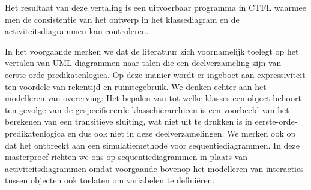 Het resultaat van deze vertaling is een uitvoerbaar programma in CTFL waarmee men de consistentie van het ontwerp in het klassediagram en de activiteitsdiagrammen kan controleren.

\parbreak

In het voorgaande merken we dat de literatuur zich voornamelijk toelegt op het vertalen van UML-diagrammen naar talen die een deelverzameling zijn van eerste-orde-predikatenlogica. Op deze manier wordt er ingeboet aan expressiviteit ten voordele van rekentijd en ruimtegebruik. We denken echter aan het modelleren van overerving: Het bepalen van tot welke klasses een object behoort ten gevolge van de gespecificeerde klassehi\"erarchie\"en is een voorbeeld van het berekenen van een transitieve sluiting, wat niet uit te drukken is in eerste-orde-predikatenlogica en dus ook niet in deze deelverzamelingen.  We merken ook op dat het ontbreekt aan een simulatiemethode voor sequentiediagrammen. In deze masterproef richten we ons op sequentiediagrammen in plaats van activiteitsdiagrammen omdat voorgaande bovenop het modelleren van interacties tussen objecten ook toelaten om variabelen te defini\"eren.